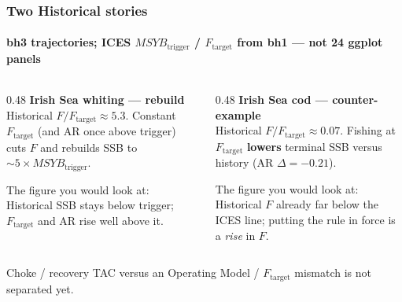 \documentclass[
  aspectratio=169,
  t,
  onlytextwidth,
  10pt,
]{beamer}
\newcommand{\Ftar}{F_{\mathrm{target}}}
\newcommand{\Btrig}{MSYB_{\mathrm{trigger}}}
\begin{document}
\begin{frame}
  \frametitle{Two Historical stories}
  \framesubtitle{bh3 trajectories; ICES $\Btrig$ / $\Ftar$ from bh1 --- not 24 ggplot panels}

  \begin{columns}[T]
    \begin{column}{0.48\linewidth}
      \textbf{Irish Sea whiting --- rebuild}\\[0.35em]
      Historical $F/\Ftar \approx 5.3$.
      Constant $\Ftar$ (and AR once above trigger) cuts $F$ and rebuilds SSB to $\sim 5\times\Btrig$.

      \vspace{0.35em}
      {\small The figure you would look at: Historical SSB stays below trigger; $F_{\mathrm{target}}$ and AR rise well above it.}
    \end{column}
    \begin{column}{0.48\linewidth}
      \textbf{Irish Sea cod --- counter-example}\\[0.35em]
      Historical $F/\Ftar \approx 0.07$.
      Fishing at $\Ftar$ \textbf{lowers} terminal SSB versus history (AR $\Delta = -0.21$).

      \vspace{0.35em}
      {\small The figure you would look at: Historical $F$ already far below the ICES line; putting the rule in force is a \emph{rise} in $F$.}
    \end{column}
  \end{columns}

  \vspace{0.5em}
  Choke / recovery TAC versus an Operating Model / $\Ftar$ mismatch is not separated yet.
\end{frame}
\end{document}
